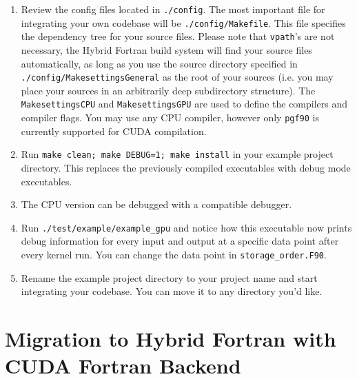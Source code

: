 {\begin{enumerate}
 \item Review the config files located in \verb|./config|. The most important file for integrating your own codebase will be \verb|./config/Makefile|. This file specifies the dependency tree for your source files. Please note that \verb|vpath|'s are not necessary, the Hybrid Fortran build system will find your source files automatically, as long as you use the source directory specified in \verb|./config/MakesettingsGeneral| as the root of your sources (i.e. you may place your sources in an arbitrarily deep subdirectory structure). The \verb|MakesettingsCPU| and \verb|MakesettingsGPU| are used to define the compilers and compiler flags. You may use any CPU compiler, however only \verb|pgf90| is currently supported for CUDA compilation.
 \item Run \verb|make clean; make DEBUG=1; make install| in your example project directory. This replaces the previously compiled executables with debug mode executables.
 \item The CPU version can be debugged with a compatible debugger.
 \item Run \verb|./test/example/example_gpu| and notice how this executable now prints debug information for every input and output at a specific data point after every kernel run. You can change the data point in \verb|storage_order.F90|.
 \item Rename the example project directory to your project name and start integrating your codebase. You can move it to any directory you'd like.
\end{enumerate}

\section{Migration to Hybrid Fortran with CUDA Fortran Backend}

}

